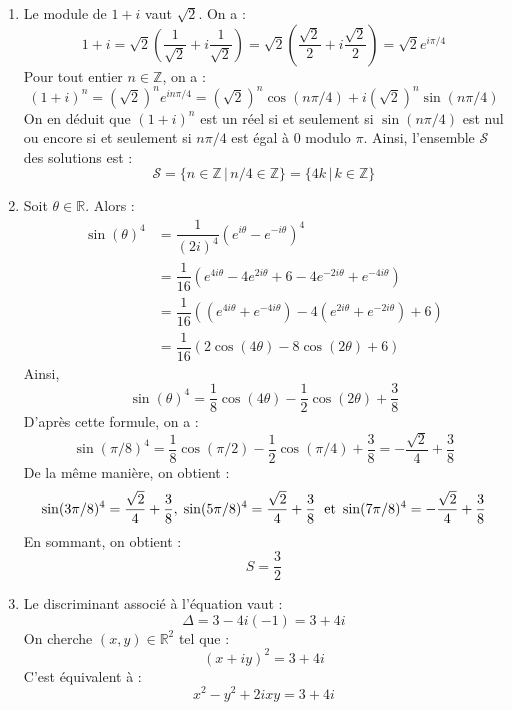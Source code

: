 \documentclass[a4paper,twoside,french,10pt]{VcCours}
\begin{document}
\begin{enumerate}
\item Le module de $1+i$ vaut $\sqrt{2}$. On a :
$$ 1+i = \sqrt{2} \left( \dfrac{1}{\sqrt{2}}+ i \dfrac{1}{\sqrt{2}} \right) = \sqrt{2} \left( \dfrac{\sqrt{2}}{2}+ i \dfrac{\sqrt{2}}{2} \right) =\sqrt{2} e^{i \pi/4}$$
Pour tout entier $n \in \mathbb{Z}$, on a :
$$ (1+i)^n = (\sqrt{2})^n e^{i n\pi/4} = (\sqrt{2})^n \cos(n\pi/4) + i (\sqrt{2})^n \sin(n\pi/4)$$
On en déduit que $(1+i)^n$ est un réel si et seulement si $\sin(n\pi/4)$ est nul ou encore si et seulement si $n \pi/4$ est égal à $0$ modulo $\pi$. Ainsi, l'ensemble $\mathcal{S}$ des solutions est :
$$ \boxed{\mathcal{S} = \lbrace n \in \mathbb{Z} \, \vert \, n/4 \in \mathbb{Z} \rbrace = \lbrace 4k \, \vert \, k \in \mathbb{Z} \rbrace }$$
\item Soit $\theta \in \mathbb{R}$. Alors :
\begin{align*}
\sin(\theta)^4 & = \dfrac{1}{(2i)^4} (e^{i \theta}-e^{-i \theta})^4 \\
& = \dfrac{1}{16} (e^{4i \theta}-4 e^{2i \theta} + 6 -4 e^{-2i \theta} + e^{-4i \theta}) \\
& = \dfrac{1}{16} ((e^{4i \theta}+ e^{-4i \theta})-4 (e^{2i \theta}+e^{-2i \theta}) + 6 ) \\
& = \dfrac{1}{16}(2 \cos(4 \theta) - 8 \cos(2 \theta)+ 6)
\end{align*}
Ainsi,
$$ \boxed{\sin(\theta)^4 = \dfrac{1}{8} \cos(4 \theta)- \dfrac{1}{2} \cos(2 \theta) + \dfrac{3}{8}}$$
D'après cette formule, on a :
$$ \sin(\pi/8)^4 =  \dfrac{1}{8} \cos(\pi/2)- \dfrac{1}{2} \cos(\pi/4) + \dfrac{3}{8} = - \dfrac{\sqrt{2}}{4} + \dfrac{3}{8}$$
De la même manière, on obtient :
$$ \sin(3\pi/8)^4 = \dfrac{\sqrt{2}}{4} + \dfrac{3}{8}, \; \sin(5\pi/8)^4 = \dfrac{\sqrt{2}}{4} + \dfrac{3}{8} \; \hbox{ et } \sin(7\pi/8)^4 = -\dfrac{\sqrt{2}}{4} + \dfrac{3}{8}$$
En sommant, on obtient :
$$ \boxed{S = \dfrac{3}{2}}$$
\item Le discriminant associé à l'équation vaut :
$$ \Delta = 3-4i(-1)=3+4i$$
On cherche $(x,y) \in \mathbb{R}^2$ tel que :
$$ (x+iy)^2=3+4i$$
C'est équivalent à :
$$ x^2-y^2 +2ixy = 3+4i$$

\end{enumerate}
\end{document}
